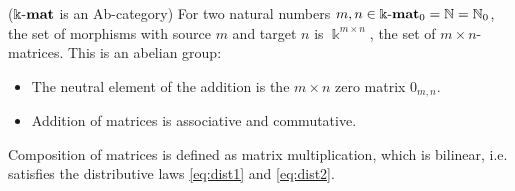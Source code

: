 \begin{example}{($\Bbbk\textnormal{-}\mathbf{mat}$ is an Ab-category)}
For two natural numbers $m,n \in {\Bbbk\textnormal{-}\mathbf{mat}}_{0} = \mathbb{N} = \mathbb{N}_{0}$, the set of morphisms with source $m$ and target $n$ is
$\Bbbk^{m\times n}$, the set of $m \times n$-matrices. This is an abelian group:
\begin{itemize}
\item The neutral element of the addition is the $m \times n$ zero matrix $0_{m,n}$.
\item Addition of matrices is associative and commutative.
\end{itemize}
Composition of matrices is defined as matrix multiplication, which is bilinear, i.e. satisfies the distributive laws \eqref{eq:dist1} and \eqref{eq:dist2}.
\end{example}


